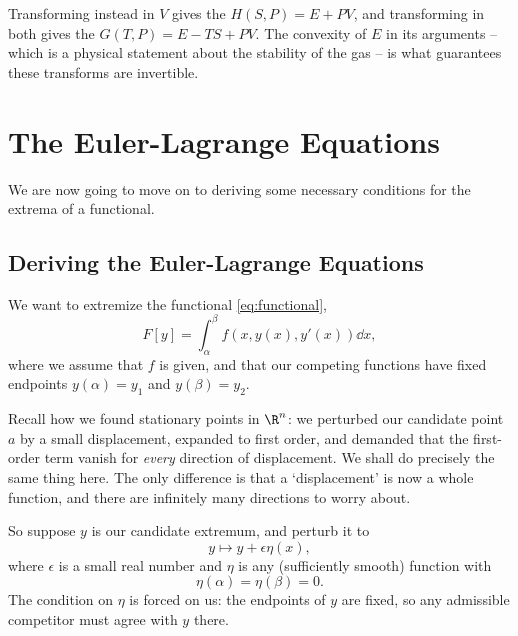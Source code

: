 \documentclass[a4paper]{scrartcl}
\begin{document}
Transforming instead in $V$ gives the  $H(S, P) = E + PV$, and transforming in both gives the  $G(T,P) = E - TS + PV$. The convexity of $E$ in its arguments -- which is a physical statement about the stability of the gas -- is what guarantees these transforms are invertible.

\section{The Euler-Lagrange Equations}

We are now going to move on to deriving some necessary conditions for the extrema of a functional.

\subsection{Deriving the Euler-Lagrange Equations}

We want to extremize the functional \eqref{eq:functional},
$$
	F[y] = \int_{\alpha}^{\beta} f(x, y(x), y'(x)) \dd x,
$$
where we assume that $f$ is given, and that our competing functions have fixed endpoints $y(\alpha) = y_1$ and $y(\beta) = y_2$.

Recall how we found stationary points in $\R^n$: we perturbed our candidate point $a$ by a small displacement, expanded to first order, and demanded that the first-order term vanish for \emph{every} direction of displacement. We shall do precisely the same thing here. The only difference is that a `displacement' is now a whole function, and there are infinitely many directions to worry about.

So suppose $y$ is our candidate extremum, and perturb it to
$$
y \mapsto y + \epsilon \eta(x),
$$
where $\epsilon$ is a small real number and $\eta$ is any (sufficiently smooth) function with
$$
\eta(\alpha) = \eta(\beta) = 0.
$$
The condition on $\eta$ is forced on us: the endpoints of $y$ are fixed, so any admissible competitor must agree with $y$ there.
\end{document}
